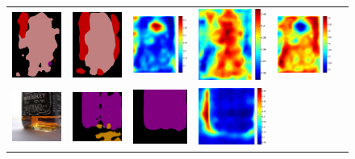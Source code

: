 \documentclass[10pt,twocolumn,letterpaper]{article}
\begin{document}
\begin{figure}
\begin{tabular}{c c c c c c}
   \includegraphics[height=0.13\linewidth]{fig/voc12/res_baseline/2011_002343.png} &
   \includegraphics[height=0.13\linewidth]{fig/voc12/res_sharenet/2011_002343.png} &
   \includegraphics[height=0.13\linewidth]{fig/voc12/att1/2011_002343.pdf} &
   \includegraphics[height=0.13\linewidth]{fig/voc12/att2/2011_002343.pdf} &
   \includegraphics[height=0.13\linewidth]{fig/voc12/att3/2011_002343.pdf} \\
   \includegraphics[height=0.11\linewidth]{fig/voc12/img/2011_003271.jpg} &
   \includegraphics[height=0.11\linewidth]{fig/voc12/res_baseline/2011_003271.png} &
   \includegraphics[height=0.11\linewidth]{fig/voc12/res_sharenet/2011_003271.png} &
   \includegraphics[height=0.11\linewidth]{fig/voc12/att1/2011_003271.pdf} &

\end{tabular}
\end{figure}
\end{document}
